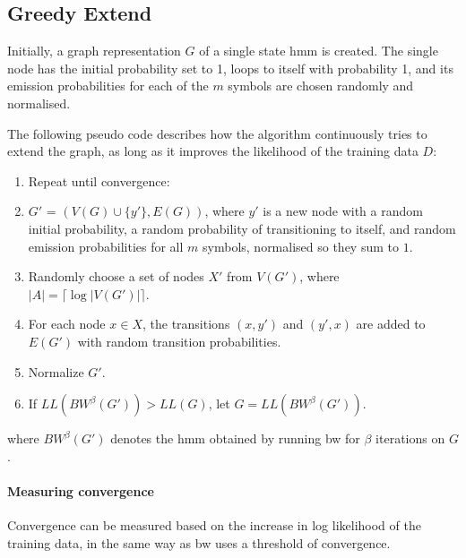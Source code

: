 \subsection{Greedy Extend}
\label{sec:greedy_extend}
Initially, a graph representation $G$ of a single state \gls{hmm} is created. The single node has the initial probability set to 1, loops to itself with probability 1, and its emission probabilities for each of the $m$ symbols are chosen randomly and normalised.

The following pseudo code describes how the algorithm continuously tries to extend the graph, as long as it improves the likelihood of the training data $D$:
\begin{enumerate}
\item Repeat until convergence:
	\item $G'$ = $(V(G) \cup \{y'\}, E(G))$, where $y'$ is a new node with a random initial probability, a random probability of transitioning to itself, and random emission probabilities for all $m$ symbols, normalised so they sum to $1$.
	\item Randomly choose a set of nodes $X'$ from $V(G')$, where $|A| = \lceil \log |V(G')| \rceil$.
	\item For each node $x \in X$, the transitions $(x, y')$ and $(y', x)$ are added to $E(G')$ with random transition probabilities.
	\item Normalize $G'$.
	\item If $LL(BW^{\beta}(G')) > LL(G)$, let $G = LL(BW^{\beta}(G'))$.
\end{enumerate}
where $BW^{\beta}(G')$ denotes the \gls{hmm} obtained by running \gls{bw} for $\beta$ iterations on $G$.

\paragraph{Measuring convergence}
Convergence can be measured based on the increase in log likelihood of the training data, in the same way as \gls{bw} uses a threshold of convergence.